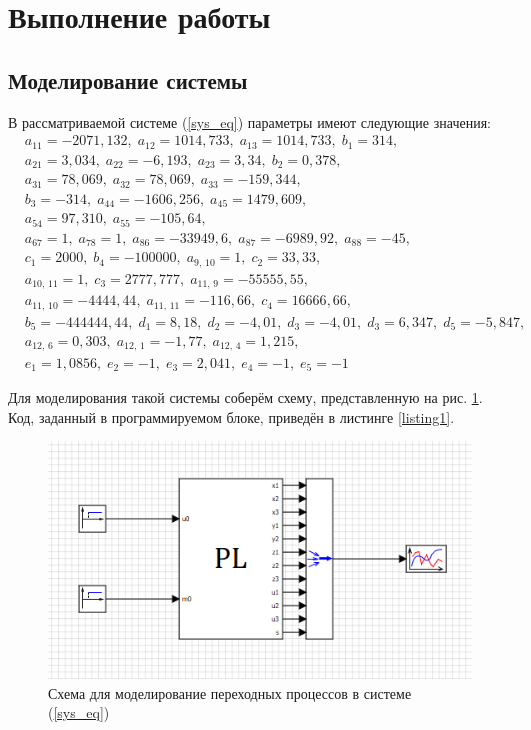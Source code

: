 	\section{Выполнение работы}
	\vspace{-3ex}
	\subsection{Моделирование системы}
	
	В рассматриваемой системе (\ref{sys_eq}) параметры имеют следующие значения:
	\begin{align*}
		&a_{11} = -2071,132,\;a_{12} = 1014,733,\; a_{13} = 1014,733,\; b_1 = 314, \\
		&a_{21} = 3,034,\; a_{22} = -6,193,\; a_{23} = 3,34,\; b_2 = 0,378, \\
		&a_{31} = 78,069,\; a_{32} = 78,069,\; a_{33} = -159,344, \\
		&b_3 = -314,\; a_{44} = -1606,256,\; a_{45} = 1479,609, \\
		&a_{54} = 97,310,\; a_{55} = -105,64, \\
		&a_{67} = 1,\; a_{78} = 1,\; a_{86} = -33949,6,\; a_{87} = -6989,92,\; a_{88} = -45, \\
		&c_1 = 2000,\; b_4 = -100000,\; a_{9,\,10} = 1,\; c_2 = 33,33, \\
		&a_{10,\,11} = 1,\; c_3 = 2777,777,\; a_{11,\,9} = -55555,55, \\
		&a_{11,\,10} = -4444,44,\; a_{11,\,11} = -116,66,\; c_4 = 16666,66, \\
		&b_5 = -444444,44,\; d_1 = 8,18,\; d_2 = -4,01,\; d_3 = -4,01,\; d_3 = 6,347,\; d_5 = -5,847, \\
		&a_{12,\,6} = 0,303,\; a_{12,\,1} = -1,77,\; a_{12,\,4} = 1,215, \\
		&e_1 = 1,0856,\; e_2 = -1,\; e_3 = 2,041,\; e_4 = -1,\; e_5 = -1
	\end{align*}
	
	Для моделирования такой системы соберём схему, представленную на рис. \ref{scheme1}. Код, заданный в программируемом блоке, приведён в листинге \ref{listing1}.
	
	\begin{figure}[!h]
		\centering\includegraphics[width=.65\textwidth]{png/scheme1.png}
		\caption{Схема для моделирование переходных процессов в системе (\ref{sys_eq})}
		\label{scheme1}
	\end{figure}
	

